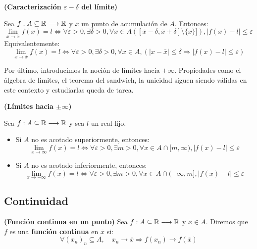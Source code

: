 \begin{proposicion}
	\textbf{(Caracterización $\varepsilon-\delta$ del límite)}
	
	Sea $f: A \subseteq \mathbb{R}\longrightarrow \mathbb{R}$ y $\bar{x}$ un punto de acumulación de $A$. Entonces: 
	$$ \lim_{x\rightarrow\bar{x}} f(x) = l \iff \forall \varepsilon > 0, \exists\delta > 0 , \forall x\in A ([\bar{x}- \delta , \bar{x}+\delta ]\setminus\{x\}]), | f(x) - l | \leq \varepsilon $$ 
	Equivalentemente: 
	$$ \lim_{x\rightarrow\bar{x}} f(x) = l \iff \forall \varepsilon > 0, \exists\delta > 0 , \forall x \in A , (| x - \bar{x}| \leq \delta \Longrightarrow | f(x) - l | \leq \varepsilon )$$ 
\end{proposicion}

Por último, introducimos la noción de límites hacia $\pm \infty$. Propiedades como el álgebra de límites, el teorema del sandwich, la unicidad siguen siendo válidas en este contexto y estudiarlas queda de tarea. 

\begin{definicion}
	\textbf{(Límites hacia $\pm \infty$)}
	
	Sea $f: A \subseteq \mathbb{R}\longrightarrow \mathbb{R}$ y sea $l$ un real fijo. 
	\begin{itemize}
		\item Si $A$ no es acotado superiormente, entonces: 
		$$\lim_{x\rightarrow\infty} f(x) = l \iff \forall \varepsilon > 0, \exists m > 0, \forall x\in A\cap [m, \infty) , | f(x) - l | \leq \varepsilon $$ 
		\item Si $A$ no es acotado inferiormente, entonces: 
		$$\lim_{x\rightarrow-\infty} f(x) = l \iff \forall \varepsilon > 0, \exists m > 0, \forall x\in A\cap (-\infty, m] , | f(x) - l | \leq \varepsilon $$ 
	\end{itemize}
\end{definicion}
	
	
\subsection{Continuidad}

\begin{definicion}
	\textbf{(Función continua en un punto)}
	Sea $f: A \subseteq \mathbb{R} \longrightarrow \mathbb{R}$ y $\bar{x} \in A$. Diremos que $f$ es una \textbf{función continua} en $\bar{x}$ si: 
	$$ \forall(x_n)_n \subseteq A , \quad x_n \longrightarrow \bar{x} \Longrightarrow f(x_n) \longrightarrow f(\bar{x}) $$ 
\end{definicion}

